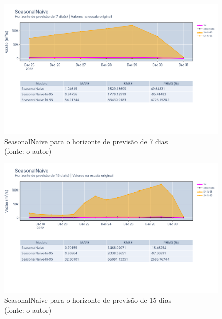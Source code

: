 \begin{figure}[!h]
	\centering
	\includegraphics[scale=0.33]{Figuras/jequiti/resultados/SeasonalNaive_fh7.png}
	\caption{SeasonalNaive para o horizonte de previsão de 7 dias\\(fonte: o autor)}
	\label{fig:jequiti_SeasonalNaive_fh7}
\end{figure}

\begin{figure}[!h]
	\centering
	\includegraphics[scale=0.33]{Figuras/jequiti/resultados/SeasonalNaive_fh15.png}
	\caption{SeasonalNaive para o horizonte de previsão de 15 dias\\(fonte: o autor)}
	\label{fig:jequiti_SeasonalNaive_fh15}
\end{figure}


